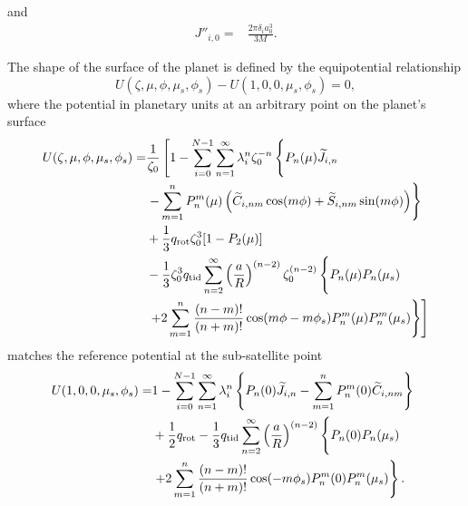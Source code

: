 %
and
%
\begin{equation} \begin{aligned} J''_{i,0} =& \frac{2\pi\delta_i a_0^3}{3 M}.
    \end{aligned} \end{equation}

The shape of the surface of the planet is defined by the equipotential relationship
%
\begin{equation} U(\zeta,\mu,\phi,\mu_s,\phi_s) -  U(1,0,0,\mu_s,\phi_s) = 0,
    \label{eq:equipotential_surface} \end{equation}
%
where the potential in planetary units at an arbitrary point on the planet's surface
%
\begin{equation} \begin{aligned} U(\zeta,\mu,\phi,\mu_s,\phi_s) =& \frac{1}{\zeta_0}
        \left[ 1 - \sum^{N-1}_{i=0} \sum^\infty_{n=1} \lambda_i^n \zeta_0^{-n}
            \left\{ P_{n}(\mu) \til{J}_{i,n} \phantom{\sum_{1}^{n}}\right. \right. \\
            & \left. - \sum_{m=1}^{n} P_n^m(\mu) \left( \til{C}_{i,nm}\cos(m\phi) +
            \til{S}_{i,nm}\sin(m\phi) \right) \right\}  \\ & + \frac{1}{3} q_{\rm
            rot} \zeta_0^3 [1 - P_2(\mu)] \\ & -\frac{1}{3} \zeta_0^{3} q_{\rm tid}
            \sum_{n=2}^\infty \left(\frac{a}{R}\right)^{(n-2)} \zeta_0^{(n-2)}
            \left\{ P_n(\mu) P_n(\mu_s) \phantom{\sum_1^n}\right. \\ & \left. \left.
        + 2 \sum_{m=1}^{n} \frac{(n-m)!}{(n+m)!} \cos(m\phi - m\phi_s) P_n^m(\mu)
    P_n^m(\mu_s) \right\} \right]\\ \end{aligned} \label{eq:surface_potential}
    \end{equation}
%
matches the reference potential at the sub-satellite point
%
\begin{equation} \begin{aligned} U(1,0,0,\mu_s,\phi_s) =& 1 - \sum^{N-1}_{i=0}
        \sum^\infty_{n=1} \lambda_i^n   \left\{ P_{n}(0) \widetilde{J}_{i,n} -
        \sum_{m=1}^{n} P_n^m(0) \widetilde{C}_{i,nm} \right\}  \\ &+ \frac{1}{2} q_{\rm
        rot}  -\frac{1}{3} q_{\rm tid} \sum_{n=2}^\infty
        \left(\frac{a}{R}\right)^{(n-2)} \left\{ P_n(0) P_n(\mu_s) \phantom{\sum_a^b}
        \right. \\ & \left. + 2 \sum_{m=1}^{n} \frac{(n-m)!}{(n+m)!} \cos(- m\phi_s)
    P_n^m(0) P_n^m(\mu_s) \right\}. \\ \end{aligned} \label{eq:surface_subsatellite}
    \end{equation}
